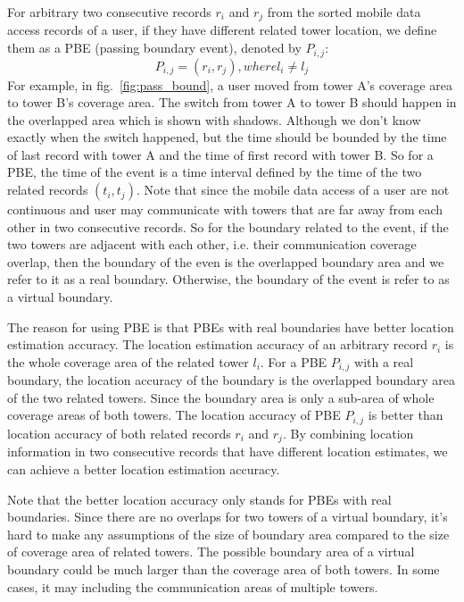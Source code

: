 For arbitrary two consecutive records $r_i$ and $r_j$ from the sorted mobile data access records of a user, if they have different related tower location, we define them as a PBE (passing boundary event), denoted by $P_{i,j}$:
\[
P_{i,j} = (r_i, r_j),  where l_i \neq l_j
\]
For example, in fig.~\ref{fig:pass_bound}, a user moved from tower A's coverage area to tower B's coverage area. The switch from tower A to tower B should happen in the overlapped area which is shown with shadows. Although we don't know exactly when the switch happened, but the time should be bounded by the time of last record with tower A and the time of first record with tower B. So for a PBE, the time of the event is a time interval defined by the time of the two related records $(t_i, t_j)$. Note that since the mobile data access of a user are not continuous and user may communicate with towers that are far away from each other in two consecutive records. So for the boundary related to the event, if the two towers are adjacent with each other, i.e. their communication coverage overlap, then the boundary of the even is the overlapped boundary area and we refer to it as a real boundary. Otherwise, the boundary of the event is refer to as a virtual boundary. 

The reason for using PBE is that PBEs with real boundaries have better location estimation accuracy. The location estimation accuracy of an arbitrary record $r_i$ is the whole coverage area of the related tower $l_i$. For a PBE $P_{i,j}$ with a real boundary, the location accuracy of the boundary is the overlapped boundary area of the two related towers. Since the boundary area is only a sub-area of whole coverage areas of both towers. The location accuracy of PBE $P_{i,j}$ is better than location accuracy of both related records $r_i$ and $r_j$. By combining location information in two consecutive records that have different location estimates, we can achieve a better location estimation accuracy.

Note that the better location accuracy only stands for PBEs with real boundaries. Since there are no overlaps for two towers of a virtual boundary, it's hard to make any assumptions of the size of boundary area compared to the size of coverage area of related towers. The possible boundary area of a virtual boundary could be much larger than the coverage area of both towers. In some cases, it may including the communication areas of multiple towers. 

